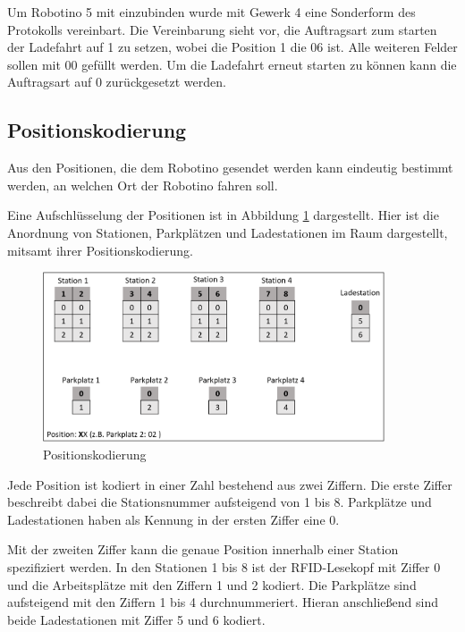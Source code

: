 Um Robotino 5 mit einzubinden wurde mit Gewerk 4 eine Sonderform des Protokolls vereinbart. Die Vereinbarung sieht vor, die Auftragsart zum starten der Ladefahrt auf 1 zu setzen, wobei die Position 1 die 06 ist. Alle weiteren Felder sollen mit 00 gefüllt werden. Um die Ladefahrt erneut starten zu können kann die Auftragsart auf 0 zurückgesetzt werden. 

\subsection{Positionskodierung}
\label{sec:Positionskodierung}

Aus den Positionen, die dem Robotino gesendet werden kann eindeutig bestimmt werden, an welchen Ort der Robotino fahren soll. 

Eine Aufschlüsselung der Positionen ist in Abbildung \ref{fig:Positionskodierung} dargestellt. Hier ist die Anordnung von Stationen, Parkplätzen und Ladestationen im Raum dargestellt, mitsamt ihrer Positionskodierung. 

\begin{figure}[htb]
    \centering
    \includegraphics[width=0.9\textwidth]{Abbildungen/Positionskodierung.PNG}
    \caption{Positionskodierung}		
    \label{fig:Positionskodierung}
\end{figure}

Jede Position ist kodiert in einer Zahl bestehend aus zwei Ziffern. Die erste Ziffer beschreibt dabei die Stationsnummer aufsteigend von 1 bis 8. Parkplätze und Ladestationen haben als Kennung in der ersten Ziffer eine 0. 

Mit der zweiten Ziffer kann die genaue Position innerhalb einer Station spezifiziert werden. In den Stationen 1 bis 8 ist der RFID-Lesekopf mit Ziffer 0 und die Arbeitsplätze mit den Ziffern 1 und 2 kodiert. Die Parkplätze sind aufsteigend mit den Ziffern 1 bis 4 durchnummeriert. Hieran anschließend sind beide Ladestationen mit Ziffer 5 und 6 kodiert. 

